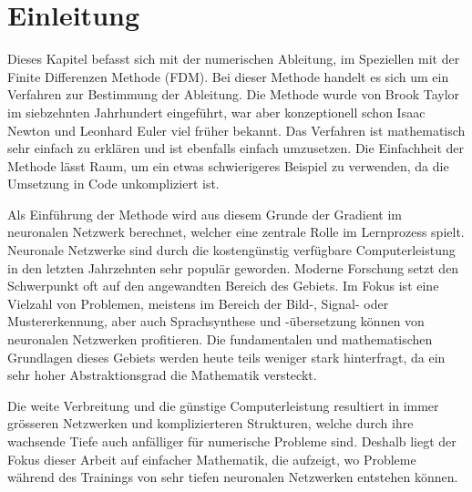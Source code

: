 %
%
%
\section{Einleitung\label{ableitung:section:einleitung}}
Dieses Kapitel befasst sich mit der numerischen Ableitung, im Speziellen mit der Finite Differenzen Methode (FDM).
%
Bei dieser Methode handelt es sich um ein Verfahren zur Bestimmung der Ableitung.
Die Methode wurde von Brook Taylor im siebzehnten Jahrhundert eingeführt, war aber konzeptionell schon Isaac Newton und Leonhard Euler viel früher bekannt. 
%
%
%
Das Verfahren ist mathematisch sehr einfach zu erklären und ist ebenfalls einfach umzusetzen. Die Einfachheit der Methode lässt Raum, um ein etwas schwierigeres Beispiel zu verwenden, da die Umsetzung in Code unkompliziert ist.

Als Einführung der Methode wird aus diesem Grunde der Gradient im neuronalen Netzwerk berechnet, welcher eine zentrale Rolle im Lernprozess spielt.
%
%
Neuronale Netzwerke sind durch die kostengünstig verfügbare
Computerleistung in den letzten Jahrzehnten sehr populär geworden.
Moderne Forschung setzt den Schwerpunkt oft auf den angewandten
Bereich des Gebiets.
Im Fokus ist eine Vielzahl von Problemen, meistens im Bereich der
Bild-, Signal- oder Mustererkennung, aber auch Sprachsynthese und
-übersetzung können von neuronalen Netzwerken profitieren.
Die fundamentalen und mathematischen Grundlagen dieses Gebiets werden heute teils weniger stark hinterfragt, da ein sehr hoher Abstraktionsgrad die Mathematik versteckt.
%
%
%
%
%

Die weite Verbreitung und die günstige Computerleistung resultiert %
in immer grösseren Netzwerken und komplizierteren Strukturen, welche durch
ihre wachsende Tiefe auch anfälliger für numerische Probleme sind.
Deshalb liegt der Fokus dieser Arbeit auf einfacher Mathematik, die
aufzeigt, wo Probleme während des Trainings von sehr tiefen neuronalen
Netzwerken entstehen können.
%
